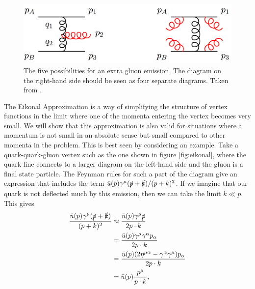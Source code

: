 \begin{figure}[t]
\centering
\includegraphics[scale=0.3]{Images/gluon_emission.png} 
\caption{The five possibilities for an extra gluon emission. The diagram on the right-hand side should be seen as four separate diagrams. Taken from \cite{Andersen2009a}.}
\label{fig:qQqgQ}
\end{figure}

The Eikonal Approximation is a way of simplifying the structure of vertex functions in the limit where one of the momenta entering the vertex becomes very small. We will show that this approximation is also valid for situations where a momentum is not small in an absolute sense but small compared to other momenta in the problem. This is best seen by considering an example. Take a quark-quark-gluon vertex such as the one shown in figure \ref{fig:eikonal}, where the quark line connects to a larger diagram on the left-hand side and the gluon is a final state particle. The Feynman rules for such a part of the diagram give an expression that includes the term $\bar{u}(p) \gamma^\mu (\slashed{p} + \slashed{k})/(p+k)^2$. If we imagine that our quark is not deflected much by this emission, then we can take the limit $k \ll p$. This gives
\begin{equation}
\begin{split}
\frac{\bar{u}(p) \gamma^\mu (\slashed{p}+\slashed{k})}{(p+k)^2} &\approx \frac{\bar{u}(p)\gamma^\mu \slashed{p}}{2 p \cdot k} \\
&= \frac{\bar{u}(p)\gamma^\mu \gamma^\alpha p_\alpha}{2 p \cdot k} \\
&=  \frac{\bar{u}(p)(2 \eta^{\mu \alpha} - \gamma^\alpha \gamma^\mu) p_\alpha}{2 p \cdot k} \\
&= \bar{u}(p) \frac{p^\mu}{p \cdot k},
\end{split}
\end{equation}
